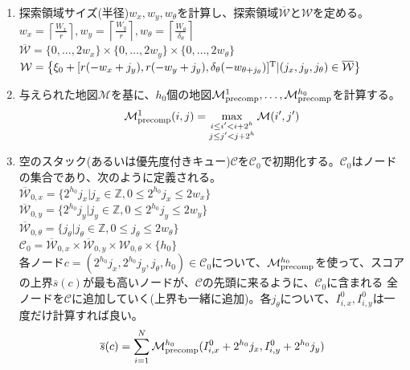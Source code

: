 \begin{enumerate}
  \item 探索領域サイズ(半径)$w_x,w_y,w_\theta$を計算し、探索領域$\overline{\mathcal{W}}$と$\mathcal{W}$を定める。\\
  $w_x = \left\lceil \frac{W_x}{r}\right\rceil, w_y = \left\lceil \frac{W_y}{r} \right\rceil, w_{\theta} = \left\lceil \frac{W_{\theta}}{\delta_{\theta}}\right\rceil$\\
  $\overline{\mathcal{W}} = \{0,\ldots,2w_x\}\times\{0,\ldots,2w_y\}\times\{0,\ldots,2w_{\theta}\}$\\
  $\mathcal{W} = \bigl\{\xi_0+[r(-w_x+j_y),r(-w_y+j_y),\delta_{\theta}(-w_{\theta+j_{\theta}})]^{\rm{T}}|(j_x,j_y,j_{\theta})\in\overline{\mathcal{W}}\bigr\}$
  \item 与えられた地図$\mathcal{M}$を基に、$h_0$個の地図$\mathcal{M}_{\rm{precomp}}^1,\ldots,\mathcal{M}_{\rm{precomp}}^{h_0}$を計算する。
  \begin{align*}
    \mathcal{M}_{\rm{precomp}}^1(i,j) = \max_{\substack{i\leq i^{\prime} < i+2^h\\j\leq j^{\prime}<j+2^h}} \mathcal{M}(i^{\prime},j^{\prime})  
  \end{align*}
  \item 空のスタック(あるいは優先度付きキュー)$\mathcal{C}$を$\mathcal{C}_0$で初期化する。$\mathcal{C}_0$はノードの集合であり、次のように定義される。\\
  $\overline{\mathcal{W}}_{0,x}=\bigl\{2^{h_0}j_x|j_x\in\mathbb{Z},0\leq 2^{h_0}j_x\leq 2w_x\bigr\}$\\
  $\overline{\mathcal{W}}_{0,y}=\bigl\{2^{h_0}j_y|j_y\in\mathbb{Z},0\leq 2^{h_0}j_y\leq 2w_y\bigr\}$\\
  $\overline{\mathcal{W}}_{0,\theta}=\bigl\{j_{\theta}|j_{\theta}\in\mathbb{Z},0\leq j_{\theta}\leq 2w_{\theta}\bigr\}$\\
  $\mathcal{C}_0 = \overline{\mathcal{W}}_{0,x}\times\overline{\mathcal{W}}_{0,y}\times\mathcal{W}_{0,\theta}\times\{h_0\}$\\
  各ノード$c=(2^{h_0}j_x,2^{h_0}j_y,j_{\theta},h_0)\in\mathcal{C}_0$について、$\mathcal{M}^{h_0}_{\rm{precomp}}$を使って、スコアの上界$\overline{s}(c)$が最も高いノードが、$\mathcal{C}$の先頭に来るように、$\mathcal{C}_0$に含まれる
  全ノードを$\mathcal{C}$に追加していく(上界も一緒に追加)。各$j_{\theta}$について、$I_{i,x}^0,I_{i,y}^0$は一度だけ計算すれば良い。\\
  \begin{align*}
    \overline{s}(c)=\sum_{i = 1}^{N}\mathcal{M}^{h_0}_{\rm{precomp}}(I_{i,x}^0+2^{h_0}j_x,I_{i,y}^{0}+2^{h_0}j_y)

\end{align*}
\end{enumerate}
